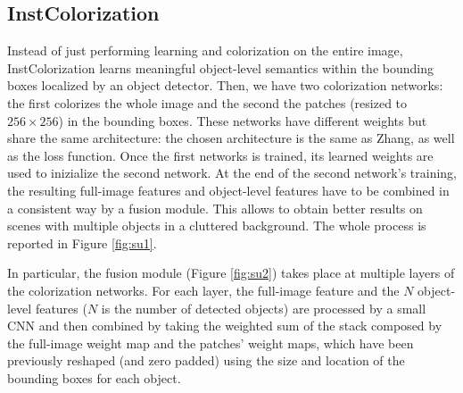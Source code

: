 \subsection{InstColorization}
Instead of just performing learning and colorization on the entire image, InstColorization learns meaningful object-level semantics within the bounding boxes localized by an object detector. Then, we have two colorization networks: the first colorizes the whole image and the second the patches (resized to $256\times256$) in the bounding boxes. These networks have different weights but share the same architecture: the chosen architecture is the same as Zhang, as well as the loss function. Once the first networks is trained, its learned weights are used to inizialize the second network. At the end of the second network's training, the resulting full-image features and object-level features have to be combined in a consistent way by a fusion module. This allows to obtain better results on scenes with multiple objects in a cluttered background. The whole process is reported in Figure \ref{fig:su1}.

In particular, the fusion module (Figure \ref{fig:su2}) takes place at multiple layers of the colorization networks. For each layer, the full-image feature and the $N$ object-level features ($N$ is the number of detected objects) are processed by a small CNN and then combined by taking the weighted sum of the stack composed by the full-image weight map and the patches' weight maps, which have been previously reshaped (and zero padded) using the size and location of the bounding boxes for each object.


